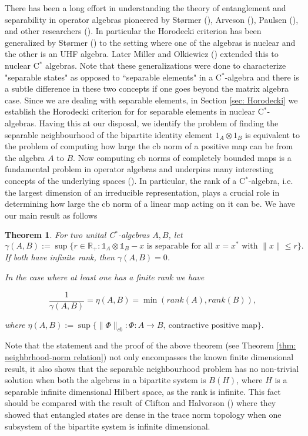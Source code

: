 \documentclass[11pt]{article}
\newtheorem*{theorem-non}{Theorem}
\numberwithin{theorem}{section}
\begin{document}
There has been a long effort in understanding the theory of entanglement and separability in operator algebras pioneered by St\o{}rmer (\cite{Stormer}), Arveson (\cite{arveson}), Paulsen (\cite{paulsen-book}), and other researchers (\cite{Paul-Tod-Tom, kribs}). In particular the Horodecki criterion has been generalized by St\o{}rmer (\cite{stormer-II}) to the setting where one of the algebras is nuclear and the other is an UHF algebra. Later Miller and Olkiewicz (\cite{MillerOlkiewicz}) extended this to nuclear C$^*$ algebras. Note that these generalizations were done to characterize "separable states" as opposed to ``separable elements" in a C$^*$-algebra and there is a subtle difference in these two concepts if one goes beyond the matrix algebra case. Since we are dealing with separable elements, in Section \ref{sec: Horodecki} we establish the Horodecki criterion for for separable elements in nuclear C$^*$-algebras. Having this at our disposal, we identify the problem of finding the separable neighbourhood of the bipartite identity element $1_A\otimes 1_B$ is equivalent  to the problem of computing how large the cb norm of a positive map  can be from the algebra $A$ to $B$. Now computing cb norms of completely bounded maps is a fundamental problem in operator algebras and underpins many interesting concepts of the underlying spaces (\cite{paulsen-book, Smithcb, MR723470}). In particular, the rank of a C$^*$-algebra, i.e. the largest dimension of an irreducible representation, plays a crucial role in determining how large the cb norm of a  
linear map acting on it can be. We have our main result as follows
\begin{theorem-non}
For two unital C$^*$-algebras $A, B$, 
let \[\gamma(A, B) := \sup\{r \in \mathbb{R}_{+}: \mathds{1}_A \otimes \mathds{1}_B - x \text{ is separable for all } x=x^{\ast}\text{ with }\|x\|\leqslant r\}.\]
If both have infinite rank, then $\gamma(A, B)=0$. 

\noindent In the case where at least one has a finite rank we have 

 \[\frac{1}{\gamma(A,B)} =\eta(A, B)= \min(rank(A), rank(B)) ,\]

where   $\eta(A, B) :=\sup\{\|\Phi\|_{cb}: \Phi: A\rightarrow B,  \ \text{contractive positive map}\}.$
\end{theorem-non}


Note that the statement and the proof of the  above theorem (see Theorem \ref{thm: neighbrhood-norm relation}) not only encompasses the known finite dimensional result, it also shows that the separable neighbourhood problem has no non-trivial solution when both the algebras in a bipartite system is $B(H)$, where $H$ is a separable infinite dimensional Hilbert space, as the rank is infinite. 
This fact should be compared with the result of Clifton and Halvorson (\cite{clifton}) where they showed that entangled states are dense in the trace norm topology when one subsystem of the bipartite system is infinite dimensional. 
\end{document}
